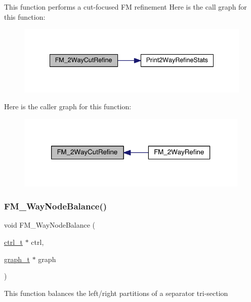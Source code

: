 This function performs a cut-\/focused FM refinement Here is the call graph for this function\+:\nopagebreak
\begin{figure}[H]
\begin{center}
\leavevmode
\includegraphics[width=338pt]{a00945_a1c215aad2804a5cba2e54e93113bc0d5_cgraph}
\end{center}
\end{figure}
Here is the caller graph for this function\+:\nopagebreak
\begin{figure}[H]
\begin{center}
\leavevmode
\includegraphics[width=316pt]{a00945_a1c215aad2804a5cba2e54e93113bc0d5_icgraph}
\end{center}
\end{figure}
\mbox{\label{a00945_a16e9d1c55ba5492b7203c98ef4a6d886}} 
\subsubsection{\texorpdfstring{F\+M\+\_\+Way\+Node\+Balance()}{FM\_2WayNodeBalance()}}
{\footnotesize\ttfamily void F\+M\+\_\+Way\+Node\+Balance (\begin{DoxyParamCaption}\item[{\hyperlink{a00742}{ctrl\+\_\+t} $\ast$}]{ctrl,  }\item[{\hyperlink{a00734}{graph\+\_\+t} $\ast$}]{graph }\end{DoxyParamCaption})}

This function balances the left/right partitions of a separator tri-\/section \mbox{\label{a00945_a7e2e4362953c8c68c6af01bfcb87d8e1}} 
